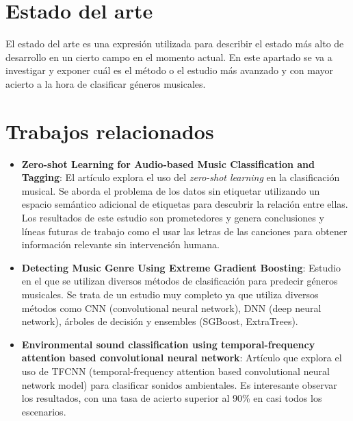 
\section{Estado del arte}

El estado del arte es una expresión utilizada para describir el estado más alto de desarrollo en un cierto campo en el momento actual. 
En este apartado se va a investigar y exponer cuál es el método o el estudio más avanzado y con mayor acierto a la hora de clasificar géneros musicales.

\section{Trabajos relacionados}

\begin{itemize}
\tightlist

\item \textbf{Zero-shot Learning for Audio-based Music Classification and Tagging}: El artículo explora el uso del \textit{zero-shot learning} en la clasificación musical. 
Se aborda el problema de los datos sin etiquetar utilizando un espacio semántico adicional de etiquetas para descubrir la relación entre ellas. 
Los resultados de este estudio son prometedores y genera conclusiones y líneas futuras de trabajo como el usar las letras de las canciones para obtener información relevante sin intervención humana.

\item \textbf{Detecting Music Genre Using Extreme Gradient Boosting}: Estudio en el que se utilizan diversos métodos de clasificación para predecir géneros musicales. Se trata de un estudio muy completo ya
que utiliza diversos métodos como CNN (convolutional neural network), DNN (deep neural network), árboles de decisión y ensembles (SGBoost, ExtraTrees).

\item \textbf{Environmental sound classification using temporal-frequency attention based convolutional neural network}: Artículo que explora el uso de TFCNN (temporal-frequency attention based convolutional neural network model)
para clasificar sonidos ambientales. Es interesante observar los resultados, con una tasa de acierto superior al 90\% en casi todos los escenarios.
\end{itemize}
